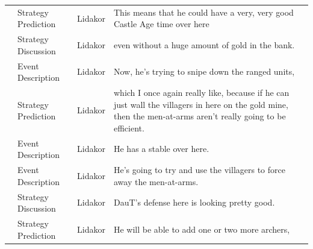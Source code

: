 {\begin{longtable}{@{}>{\theAppRow}r|L{2.3cm}L{1.0cm}U{11.55cm}@{}}
    & Strategy Prediction   & Lidakor & This means that he could have a very, very good Castle Age time over here                                                                                                                                                                                                                       \\
    & Strategy Discussion   & Lidakor & even without a huge amount of gold in the bank.                                                                                                                                                                                                                                                 \\
    & Event Description     & Lidakor & Now, he's trying to snipe down the ranged units,                                                                                                                                                                                                                                                \\
    & Strategy Prediction   & Lidakor & which I once again really like, because if he can just wall the villagers in here on the gold mine, then the men-at-arms aren't really going to be efficient.                                                                                                                                   \\
    & Event Description     & Lidakor & He has a stable over here.                                                                                                                                                                                                                                                                      \\
    & Event Description     & Lidakor & He's going to try and use the villagers to force away the men-at-arms.                                                                                                                                                                                                                          \\
    & Strategy Discussion   & Lidakor & DauT's defense here is looking pretty good.                                                                                                                                                                                                                                                     \\
    & Strategy Prediction   & Lidakor & He will be able to add one or two more archers,                                                                                                                                                                                                                                                 \\

\end{longtable}}
